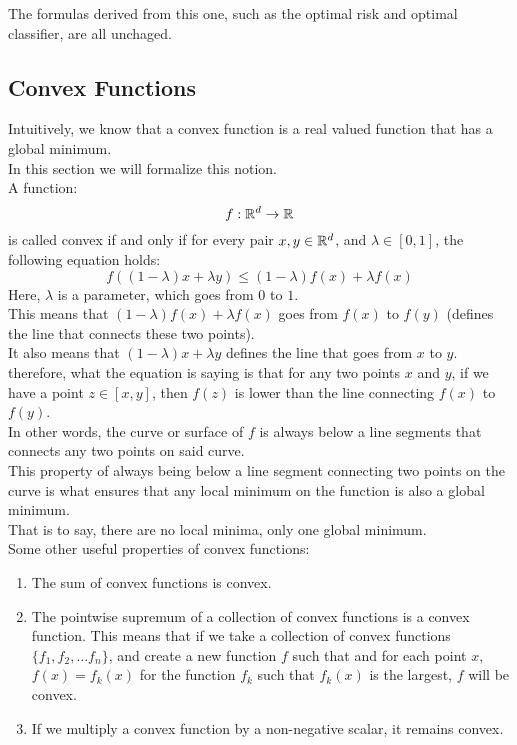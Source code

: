 \documentclass[12pt]{article}
\begin{document}
The formulas derived from this one,
such as the optimal risk and optimal
classifier, are all unchaged. \\

\newpage

\subsection*{Convex Functions}

Intuitively, we know that a convex function
is a real valued function that has a
global minimum. \\
In this section we will formalize this notion. \\

A function:
\[ f: \mathbb{R}^d \to \mathbb{R} \]
is called convex if and only if
for every pair
$x, y \in \mathbb{R}^d$,
and $\lambda \in [0, 1]$,
the following equation holds:
\[ f((1-\lambda)x + \lambda y)
\leq (1-\lambda)f(x) + \lambda f(x) \]
Here, $\lambda$ is a parameter,
which goes from $0$ to $1$. \\
This means that 
$(1-\lambda)f(x) + \lambda f(x)$
goes from $f(x)$ to $f(y)$
(defines the line that connects these
two points). \\
It also means that $(1-\lambda)x + \lambda y$
defines the line that goes from $x$ to $y$. \\
therefore, what the equation is saying
is that for any two points $x$ and $y$,
if we have a point $z \in [x, y]$,
then $f(z)$ is lower than the
line connecting $f(x)$ to $f(y)$. \\
In other words,
the curve or surface of $f$
is always below a line segments
that connects any two points
on said curve. \\

This property of always being
below a line segment connecting
two points on the curve is what ensures
that any local minimum on the function
is also a global minimum. \\
That is to say, there are no local
minima,
only one global minimum. \\

Some other useful properties of convex
functions:
\begin{enumerate}
    \item
    The sum of convex functions is
    convex.
    \item 
    The pointwise supremum of a collection
    of convex functions is a convex function.
    This means that if we take a collection
    of convex functions $\{f_1, f_2, \dots f_n\}$,
    and create a new function $f$ such that
    and for each point $x$,
    $f(x) = f_k(x)$ for the function $f_k$
    such that $f_k(x)$ is the largest,
    $f$ will be convex.
    \item 
    If we multiply a convex function by a 
    non-negative scalar, it remains convex. \\
\end{enumerate}
\end{document}
